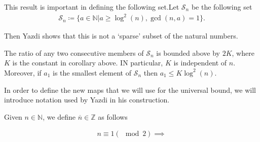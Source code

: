 This result is important in defining the following set.Let $\mathcal{S}_n$ be the following set
\begin{align*}
    \mathcal{S}_n \coloneqq \{a \in \mathbb{N} \vert a \geq \log^2(n), \gcd(n,a) = 1\}.
\end{align*}

Then Yazdi shows that this is not a `sparse' subset of the natural numbers.

\begin{lemma}[Yazdi]
The ratio of any two consecutive members of $\mathcal{S}_n$ is bounded above by $2K$, where $K$ is the constant in corollary above. IN particular, $K$ is independent of $n$. Moreover, if $a_1$ is the smallest element of $\mathcal{S}_n$ then $a_1 \leq K\log^2(n)$.
\end{lemma}

In order to define the new maps that we will use for the universal bound, we will introduce notation used by Yazdi in his construction.

Given $n \in \mathbb{N}$, we define $\overline{n} \in \mathbb{Z}$ as follows

\begin{gather*}
    n \equiv 1 (\mod 2) \implies 
\end{gather*}
